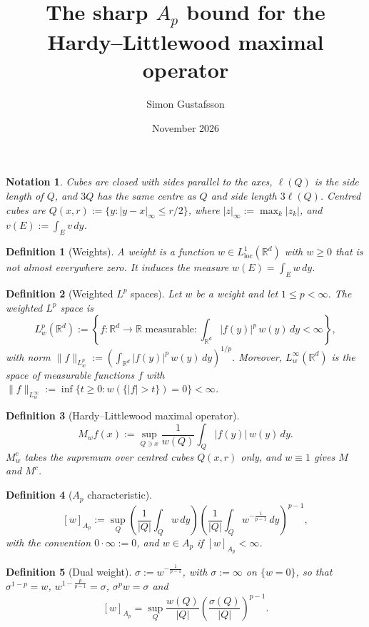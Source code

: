 \documentclass[12pt]{article}
\title{The sharp $A_p$ bound for the\\
       Hardy--Littlewood maximal operator\\[0.3em]}
\author{Simon Gustafsson}
\date{November 2026}
\newtheorem{definition}{Definition}
\newtheorem*{notation}{Notation}
\begin{document}
\pagestyle{empty}

\begin{notation}
Cubes are closed with sides parallel to the axes, $\ell(Q)$ is the side length of $Q$, and $3Q$ has the same centre as $Q$ and side length $3\ell(Q)$. Centred cubes are $Q(x,r) := \{y : |y - x|_\infty \le r/2\}$, where $|z|_\infty := \max_k |z_k|$, and $v(E) := \int_E v\,dy$.
\end{notation}

\begin{definition}[Weights]
A \emph{weight} is a function $w \in L^1_{\mathrm{loc}}(\mathbb{R}^d)$ with $w \ge 0$ that is not almost everywhere zero. It induces the measure $w(E) = \int_E w\,dy$.
\end{definition}

\begin{definition}[Weighted $L^p$ spaces]
Let $w$ be a weight and let $1 \le p < \infty$. The weighted $L^p$ space is
\[
  L^p_w(\mathbb{R}^d) := \left\{ f : \mathbb{R}^d \to \mathbb{R} \text{ measurable} : \int_{\mathbb{R}^d} |f(y)|^p\, w(y)\,dy < \infty \right\},
\]
with norm $\|f\|_{L^p_w} := \left( \int_{\mathbb{R}^d} |f(y)|^p\, w(y)\,dy \right)^{1/p}$. Moreover, $L^\infty_w(\mathbb{R}^d)$ is the space of measurable functions $f$ with $\|f\|_{L^\infty_w} := \inf\{ t \ge 0 : w(\{|f| > t\}) = 0 \} < \infty$.
\end{definition}
\begin{definition}[Hardy--Littlewood maximal operator]
\[
  M_w f(x) := \sup_{Q \ni x} \frac{1}{w(Q)} \int_Q |f(y)|\, w(y)\,dy .
\]
$M^c_w$ takes the supremum over centred cubes $Q(x,r)$ only, and $w \equiv 1$ gives $M$ and $M^c$.
\end{definition}
\begin{definition}[$A_p$ characteristic]
\[
  [w]_{A_p} := \sup_{Q} \left( \frac{1}{|Q|} \int_Q w\,dy \right) \left( \frac{1}{|Q|} \int_Q w^{-\frac{1}{p-1}}\,dy \right)^{p-1},
\]
with the convention $0 \cdot \infty := 0$, and $w \in A_p$ if $[w]_{A_p} < \infty$.
\end{definition}
\begin{definition}[Dual weight]
$\sigma := w^{-\frac{1}{p-1}}$, with $\sigma := \infty$ on $\{w = 0\}$, so that $\sigma^{1-p} = w$, $w^{1-\frac{p}{p-1}} = \sigma$, $\sigma^p w = \sigma$ and
\[
  [w]_{A_p} = \sup_Q \frac{w(Q)}{|Q|} \left( \frac{\sigma(Q)}{|Q|} \right)^{p-1}.
\]
\end{definition}
\end{document}
